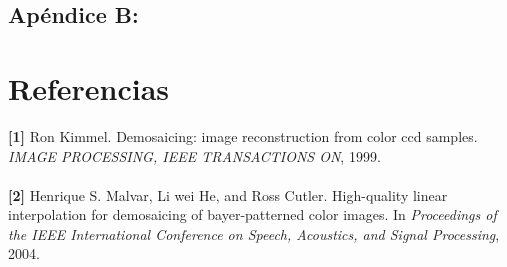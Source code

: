\documentclass[a4paper]{article}
\begin{document}
\subsection{Ap\'endice B:}
\newpage
\section{Referencias}
 
\textbf{[1]} Ron Kimmel. Demosaicing: image reconstruction from color ccd samples. \textit{IMAGE PROCESSING, IEEE TRANSACTIONS ON}, 1999. \\
\\

\textbf{[2]} Henrique S. Malvar, Li wei He, and Ross Cutler. High-quality linear interpolation for
demosaicing of bayer-patterned color images. In \textit{Proceedings of the IEEE International
Conference on Speech, Acoustics, and Signal Processing}, 2004.
\end{document}
